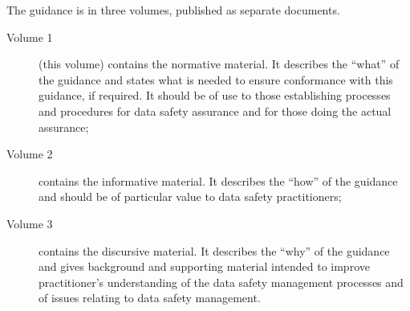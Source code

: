 The guidance is in three volumes, published as separate documents.
\begin{description}
	\item[Volume 1] (this volume) contains the normative material. It describes the ``what'' of the guidance and states what is needed to ensure conformance with this guidance, if required. It should be of use to those establishing processes and procedures for data safety assurance and for those doing the actual assurance;
	\item[Volume 2] contains the informative material. It describes the ``how'' of the guidance and should be of particular value to data safety practitioners;
	\item[Volume 3] contains the discursive material. It describes the ``why'' of the guidance and gives background and supporting material intended to improve practitioner's understanding of the data safety management processes and of issues relating to data safety management.
\end{description}
	
